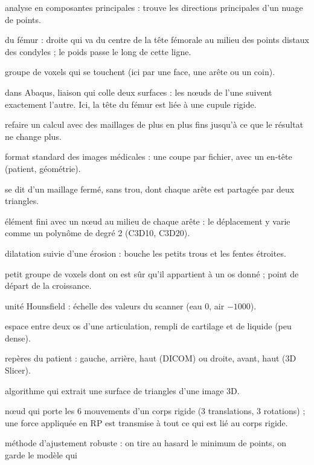 \documentclass[11pt,a4paper]{article}
\begin{document}
\begin{description}[style=nextline, leftmargin=1.2cm, itemsep=1pt]
  \item[ACP] analyse en composantes principales : trouve les directions principales d'un nuage de points.
  \item[Axe mécanique] du fémur : droite qui va du centre de la tête fémorale au milieu des points distaux des
  condyles ; le poids passe le long de cette ligne.
  \item[Composante connexe] groupe de voxels qui se touchent (ici par une face, une arête ou un coin).
  \item[Contrainte Tie] dans Abaqus, liaison qui colle deux surfaces : les nœuds de l'une suivent exactement l'autre.
  Ici, la tête du fémur est liée à une cupule rigide.
  \item[Convergence (étude de)] refaire un calcul avec des maillages de plus en plus fins jusqu'à ce que le résultat ne
  change plus.
  \item[DICOM] format standard des images médicales : une coupe par fichier, avec un en-tête (patient, géométrie).
  \item[Étanche] se dit d'un maillage fermé, sans trou, dont chaque arête est partagée par deux triangles.
  \item[Élément quadratique] élément fini avec un nœud au milieu de chaque arête : le déplacement y varie comme un
  polynôme de degré 2 (C3D10, C3D20).
  \item[Fermeture morphologique] dilatation suivie d'une érosion : bouche les petits trous et les fentes étroites.
  \item[Graine] petit groupe de voxels dont on est sûr qu'il appartient à un os donné ; point de départ de la croissance.
  \item[HU] unité Hounsfield : échelle des valeurs du scanner (eau 0, air $-1000$).
  \item[Interligne] espace entre deux os d'une articulation, rempli de cartilage et de liquide (peu dense).
  \item[LPS, RAS] repères du patient : gauche, arrière, haut (DICOM) ou droite, avant, haut (3D Slicer).
  \item[Marching cubes] algorithme qui extrait une surface de triangles d'une image 3D.
  \item[Point de référence (RP)] nœud qui porte les 6 mouvements d'un corps rigide (3 translations, 3 rotations) ;
  une force appliquée en RP est transmise à tout ce qui est lié au corps rigide.
  \item[RANSAC] méthode d'ajustement robuste : on tire au hasard le minimum de points, on garde le modèle qui

\end{description}
\end{document}
